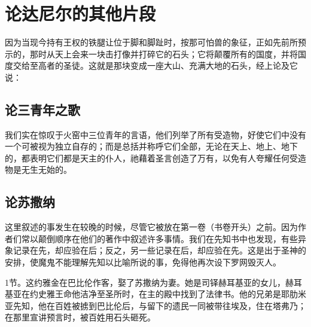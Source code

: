 
\section{论达尼尔的其他片段}

因为当现今持有王权的铁腿让位于脚和脚趾时，按那可怕兽的象征，正如先前所预示的，那时从天上会来一块击打像并打碎它的石头；它将颠覆所有的国度，并将国度交给至高者的圣徒。这就是那块变成一座大山、充满大地的石头，经上论及它说：\par


\subsection{论三青年之歌}

\par

我们实在惊叹于火窑中三位青年的言语，他们列举了所有受造物，好使它们中没有一个可被视为独立自存的；而是总括并称呼它们全部，无论在天上、地上、地下的，都表明它们都是天主的仆人，祂藉着圣言创造了万有，以免有人夸耀任何受造物是无生无始的。\par


\subsection{论苏撒纳}

这里叙述的事发生在较晚的时候，尽管它被放在第一卷（书卷开头）之前。因为作者们常以颠倒顺序在他们的著作中叙述许多事情。我们在先知书中也发现，有些异象记录在先，却应验在后；反之，另一些记录在后，却应验在先。这是出于圣神的安排，使魔鬼不能理解先知以比喻所说的事，免得他再次设下罗网毁灭人。\par

1节。这约雅金在巴比伦作客，娶了苏撒纳为妻。她是司铎赫耳基亚的女儿，赫耳基亚在约史雅王命他洁净至圣所时，在主的殿中找到了法律书。他的兄弟是耶肋米亚先知，他在百姓被掳到巴比伦后，与留下的遗民一同被带往埃及，住在塔弗乃；在那里宣讲预言时，被百姓用石头砸死。\par

